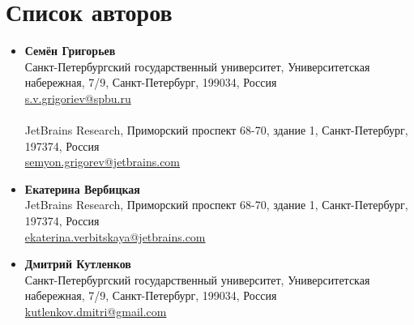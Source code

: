 \chapter*{Список авторов}
    \begin{itemize}
        \item \textbf{Семён Григорьев} \\
              Санкт-Петербургский государственный университет, Университетская набережная, 7/9, Санкт-Петербург, 199034, Россия \\
              \url{s.v.grigoriev@spbu.ru}\\
              \\
              JetBrains Research, Приморский проспект 68-70, здание 1, Санкт-Петербург, 197374, Россия \\
              \url{semyon.grigorev@jetbrains.com}


        \item \textbf{Екатерина Вербицкая} \\
              JetBrains Research, Приморский проспект 68-70, здание 1, Санкт-Петербург, 197374, Россия \\
              \url{ekaterina.verbitskaya@jetbrains.com}
              

        \item \textbf{Дмитрий Кутленков} \\
              Санкт-Петербургский государственный университет, Университетская набережная, 7/9, Санкт-Петербург, 199034, Россия \\
              \url{kutlenkov.dmitri@gmail.com}
              
    \end{itemize}

